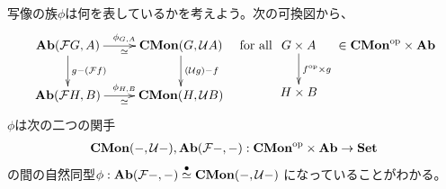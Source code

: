 {	写像の族$\phi$は何を表しているかを考えよう。次の可換図から、
	\begin{equation*}\begin{split}
		\xymatrix{
			\cat{Ab}(\calF G,A) \ar[r]^{\phi_{G,A}}_\simeq \ar[d]^{g-(\calF f)} 
			& \cat{CMon}(G,\calU A) \ar[d]^{(\calU g)-f} \\
			\cat{Ab}(\calF H,B) \ar[r]^{\phi_{H,B}}_\simeq
			& \cat{CMon}(H,\calU B)
		} \quad\text{for all } \xymatrix{
			G\times A \ar[d]^{f^\opp\times g} \\ H\times B
		} \in \cat{CMon}^\opp\times\cat{Ab}
	\end{split}\end{equation*}
	$\phi$は次の二つの関手
	\begin{equation*}\begin{split}
		{\ensuremath{\mathbf{{CMon}}}}(-,\mathcal{U}-),{\mathbf{{Ab}}}(\mathcal{F}-,-) 
		: {\mathbf{{CMon}}}^{\mathinner{{\operatorname{op}}}}\times{\ensuremath{\mathbf{{Ab}}}}\to{\ensuremath{\mathbf{{Set}}}} \\
	\end{split}\end{equation*}
	の間の自然同型$\phi:{\mathbf{{Ab}}}(\mathcal{F}-,-)
	\overset{\bullet}{\simeq}{\mathbf{{CMon}}}(-,\mathcal{U}-)$
	になっていることがわかる。

}
